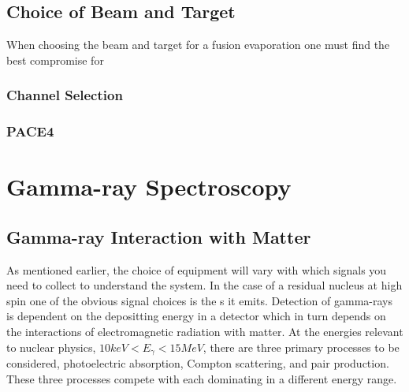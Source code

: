 \subsection{Choice of Beam and Target}
\label{ssec:exp-pr-fus-evap-beam-target}
When choosing the beam and target for a fusion evaporation one must find the best compromise for 
\subsubsection{Channel Selection}
\label{sssec:exp-pr-fus-evap-beam-target-channel}
\subsubsection{PACE4}
\label{sssec:exp-pr-fus-evap-beam-pace4}

\section{Gamma-ray Spectroscopy}
\label{sec:exp-pr-gamma-spec}
\subsection{Gamma-ray Interaction with Matter}
\label{ssec:exp-pr-gamma-spec-interactions}
As mentioned earlier, the choice of equipment will vary with which signals you need to collect to understand the system. In the case of a residual nucleus at high spin one of the obvious signal choices is the \gr{}s it emits. Detection of gamma-rays is dependent on the \gr{} depositting energy in a detector which in turn depends on the interactions of electromagnetic radiation with matter. At the energies relevant to nuclear physics, $10keV<E_{\gamma}<15MeV$, there are three primary processes to be considered, photoelectric absorption, Compton scattering, and pair production. These three processes compete with each dominating in a different energy range.

